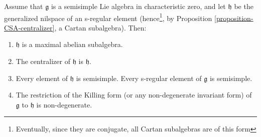 \begin{proposition}
\label{proposition-CSA-semisimple}
 Assume that $\mathfrak g$ is a semisimple  Lie algebra in characteristic zero, and let $\mathfrak h$ be the generalized nilspace of an s-regular element (hence\footnote{Eventually, since they are conjugate, all Cartan subalgebras are of this form}, by Proposition \ref{proposition-CSA-centralizer}, a Cartan subalgebra). Then:
\begin{enumerate}
 \item $\mathfrak h$ is a maximal abelian subalgebra.
 \item The centralizer of $\mathfrak h$ is $\mathfrak h$.
 \item Every element of $\mathfrak h$ is semisimple. Every s-regular element of $\mathfrak g$ is semisimple.
 \item \label{Killingrestriction} The restriction of the Killing form (or any non-degenerate invariant form) of $\mathfrak g$ to $\mathfrak h$ is non-degenerate.
\end{enumerate}
\end{proposition}

